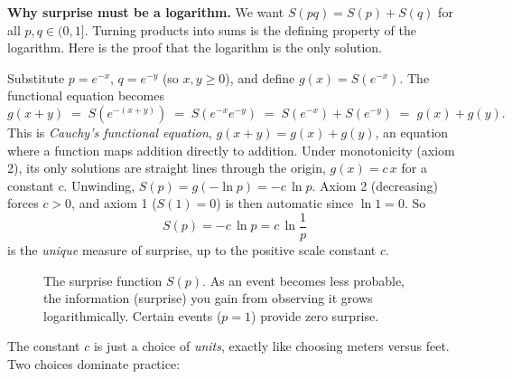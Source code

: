 \begin{whybox}
\textbf{Why surprise must be a logarithm.} We want $S(pq) = S(p) + S(q)$ for all $p,q \in (0,1]$. Turning
products into sums is the defining property of the logarithm. Here is the proof that the logarithm is the only solution.

Substitute $p = e^{-x}$, $q = e^{-y}$ (so $x,y \ge 0$), and define $g(x) = S(e^{-x})$. The functional
equation becomes
\[
  g(x + y) \;=\; S(e^{-(x+y)}) \;=\; S(e^{-x} e^{-y}) \;=\; S(e^{-x}) + S(e^{-y}) \;=\; g(x) + g(y).
\]
This is \emph{Cauchy's functional equation}, $g(x+y) = g(x) + g(y)$, an equation where a function maps
addition directly to addition. Under monotonicity (axiom 2), its
only solutions are straight lines through the origin, $g(x) = c\,x$ for a constant $c$. Unwinding,
$S(p) = g(-\ln p) = -c\,\ln p$. Axiom 2 (decreasing) forces $c > 0$, and axiom 1 ($S(1)=0$) is then
automatic since $\ln 1 = 0$. So
\[
  \boxed{\,S(p) = -c\,\ln p = c\,\ln\frac{1}{p}\,}
\]
is the \emph{unique} measure of surprise, up to the positive scale constant $c$.
\end{whybox}


\begin{figure}[htbp]
\centering
{}
\caption{The surprise function $S(p)$. As an event becomes less probable, the information (surprise) you gain from observing it grows logarithmically. Certain events ($p=1$) provide zero surprise.}
\label{ch33:fig-surprise}
\end{figure}


The constant $c$ is just a choice of \emph{units}, exactly like choosing meters versus feet. Two choices
dominate practice:

